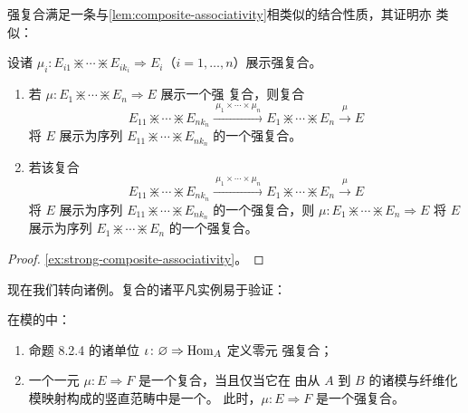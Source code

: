 强复合满足一条与\cref{lem:composite-associativity}相类似的结合性质，其证明亦
类似：

\begin{lemma}\label{lem:strong-composite-associativity}
设诸\trCell{} $\mu_{i}\colon E_{i1}\divideontimes\cdots\divideontimes E_{ik_{i}}\Rightarrow E_{i}$（$i=1,\ldots,n$）展示强复合。

\begin{enumerate}[label=(\roman*)]
\item 若 $\mu\colon E_{1}\divideontimes\cdots\divideontimes E_{n}\Rightarrow E$ 展示一个强
复合，则复合\trCell
\begin{equation*}
E_{11}\divideontimes\cdots\divideontimes E_{nk_{n}}
\xrightarrow{\ \mu_{1}\times\cdots\times\mu_{n}\ }
E_{1}\divideontimes\cdots\divideontimes E_{n}
\xrightarrow{\ \mu\ }
E
\end{equation*}
将 $E$ 展示为序列 $E_{11}\divideontimes\cdots\divideontimes E_{nk_{n}}$ 的一个强复合。
\item 若该复合\trCell
\begin{equation*}
E_{11}\divideontimes\cdots\divideontimes E_{nk_{n}}
\xrightarrow{\ \mu_{1}\times\cdots\times\mu_{n}\ }
E_{1}\divideontimes\cdots\divideontimes E_{n}
\xrightarrow{\ \mu\ }
E
\end{equation*}
将 $E$ 展示为序列 $E_{11}\divideontimes\cdots\divideontimes E_{nk_{n}}$ 的一个强复合，则
$\mu\colon E_{1}\divideontimes\cdots\divideontimes E_{n}\Rightarrow E$ 将 $E$ 展示为序列
$E_{1}\divideontimes\cdots\divideontimes E_{n}$ 的一个强复合。
\end{enumerate}
\end{lemma}

\begin{proof}
\cref{ex:strong-composite-associativity}。
\end{proof}

现在我们转向诸例。复合的诸平凡实例易于验证：

\begin{lemma}\label{lem:trivial-composites}
在模的\trVirtualEquipment{}中：
\begin{enumerate}[label=(\roman*)]
\item 命题 8.2.4 的诸单位 $\iota\colon\varnothing\Rightarrow \mathrm{Hom}_{A}$ 定义零元
强复合；
\item 一个一元\trCell{} $\mu\colon E\Rightarrow F$ 是一个复合，当且仅当它在
由从 $A$ 到 $B$ 的诸模与纤维化模映射构成的竖直范畴中是一个\trIsomorphism。
此时，$\mu\colon E\Rightarrow F$ 是一个强复合。
\end{enumerate}
\end{lemma}

